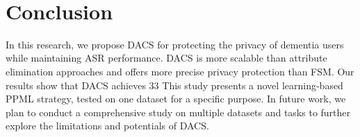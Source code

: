 \
\section{Conclusion}

In this research, we propose DACS for protecting the privacy of dementia users while maintaining ASR performance. DACS is more scalable than attribute elimination approaches and offers more precise privacy protection than FSM. Our results show that DACS achieves 33%
This study presents a novel learning-based PPML strategy, tested on one dataset for a specific purpose. In future work, we plan to conduct a comprehensive study on multiple datasets and tasks to further explore the limitations and potentials of DACS.
